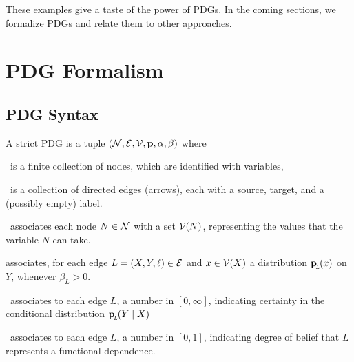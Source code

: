 \documentclass{article}
\begin{document}
These examples give a taste of the power of PDGs.  In the coming sections, we formalize PDGs and relate them to other approaches.		
	

	\section{PDG Formalism}
	\subsection{PDG Syntax}
	\def\pdgvars[#1]{(\N#1, \Ed#1, \V#1, \mat p#1, \alpha#1,\beta#1)}
	\begin{defn}[sPDG]\label{def:sPDG}
		A strict PDG is a tuple $\pdgvars[]$ where
		\begin{description}[nosep]
			\item[$\N$]~is a finite collection of nodes, which are identified with variables,
			\item[$\Ed$]~is a collection of directed edges (arrows), each with a source, target, and a (possibly empty) label.
			\item[$\V$]~associates each node $N \in \mathcal N$ with a set $\mathcal V(N)$,
			representing the values that the variable $N$ can take. 
			\item[$\mathbf p$] associates, for each edge $L = (X,Y, \ell) \in \mathcal E$ and $x \in \mathcal V(X)$ a distribution $\mathbf{p}_{\!_L\!}(x)$ on $Y$, whenever $\beta_L > 0$.
			\item[$\beta$]~associates to each edge $L$, a number in $[0,\infty]$, indicating certainty in the conditional distribution $\mathbf{p}_{\!_L\!}(Y \mid X)$ 
			\item[$\alpha$]~associates to each edge $L$, a number in $[0,1]$, indicating degree of belief that $L$ represents a functional dependence.
		\end{description}
		\vspace{-1.4em}
	\end{defn}
\end{document}
